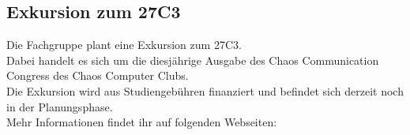\subsection{Exkursion zum 27C3}
Die Fachgruppe plant eine Exkursion zum 27C3. \\Dabei handelt es sich um
die diesjährige Ausgabe des Chaos Communication Congress des Chaos
Computer Clubs.\\ Die Exkursion wird aus
Studiengebühren finanziert und befindet sich derzeit noch in der
Planungsphase. \\Mehr Informationen findet ihr auf folgenden
Webseiten:\\
\\
